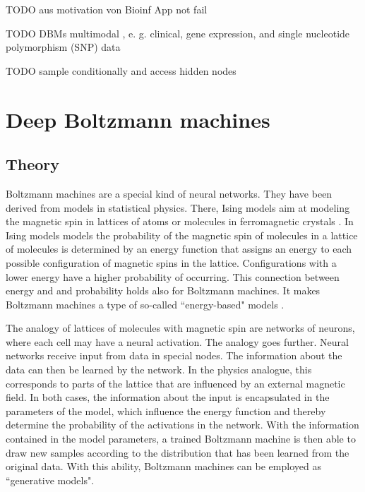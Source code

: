 \documentclass[12pt]{article}
\begin{document}

TODO aus motivation von Bioinf App not fail

TODO DBMs multimodal , e. g. clinical, gene expression, and single nucleotide polymorphism (SNP) data

TODO sample conditionally and access hidden nodes

\clearpage
\section{Deep Boltzmann machines}
\subsection{Theory}\label{bmtheory}

Boltzmann machines \citep{ackley_boltzmann_1985} are a special kind of neural networks.
They have been derived from models in statistical physics.
There, Ising models aim at modeling the magnetic spin in lattices of atoms or molecules in ferromagnetic crystals \citep{isingmodel}.
In Ising models models the probability of the magnetic spin of molecules in a lattice of molecules is determined by an energy function that assigns an energy to each possible configuration of magnetic spins in the lattice.
Configurations with a lower energy have a higher probability of occurring.
This connection between energy and and probability holds also for Boltzmann machines.
It makes Boltzmann machines a type of so-called ``energy-based" models \citep{ranzato_ebm}.

The analogy of lattices of molecules with magnetic spin are networks of neurons, where each cell may have a neural activation.
The analogy goes further.
Neural networks receive input from data in special nodes.
The information about the data can then be learned by the network.
In the physics analogue, this corresponds to parts of the lattice that are influenced by an external magnetic field.
In both cases, the information about the input is encapsulated in the parameters of the model, which influence the energy function and thereby determine the probability of the activations in the network.
With the information contained in the model parameters, a trained Boltzmann machine is then able to draw new samples according to the distribution that has been learned from the original data.
With this ability, Boltzmann machines can be employed as ``generative models".
\end{document}

